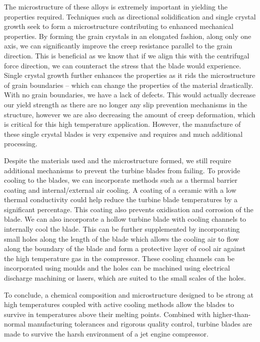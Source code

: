 \documentclass[11pt]{article}
\numberwithin{equation}{section}
\begin{document}
The microstructure of these alloys is extremely important in yielding the properties required. Techniques such as directional solidification and single crystal growth seek to form a microstructure contributing to enhanced mechanical properties. By forming the grain crystals in an elongated fashion, along only one axis, we can significantly improve the creep resistance parallel to the grain direction. This is beneficial as we know that if we align this with the centrifugal force direction, we can counteract the stress that the blade would experience. Single crystal growth further enhances the properties as it rids the microstructure of grain boundaries – which can change the properties of the material drastically. With no grain boundaries, we have a lack of defects. This would actually decrease our yield strength as there are no longer any slip prevention mechanisms in the structure, however we are also decreasing the amount of creep deformation, which is critical for this high temperature application. However, the manufacture of these single crystal blades is very expensive and requires and much additional processing. 

Despite the materials used and the microstructure formed, we still require additional mechanisms to prevent the turbine blades from failing. To provide cooling to the blades, we can incorporate methods such as a thermal barrier coating and internal/external air cooling. A coating of a ceramic with a low thermal conductivity could help reduce the turbine blade temperatures by a significant percentage. This coating also prevents oxidisation and corrosion of the blade. We can also incorporate a hollow turbine blade with cooling channels to internally cool the blade. This can be further supplemented by incorporating small holes along the length of the blade which allows the cooling air to flow along the boundary of the blade and form a protective layer of cool air against the high temperature gas in the compressor. These cooling channels can be incorporated using moulds and the holes can be machined using electrical discharge machining or lasers, which are suited to the small scales of the holes.

To conclude, a chemical composition and microstructure designed to be strong at high temperatures coupled with active cooling methods allow the blades to survive in temperatures above their melting points. Combined with higher-than-normal manufacturing tolerances and rigorous quality control, turbine blades are made to survive the harsh environment of a jet engine compressor.
\end{document}
